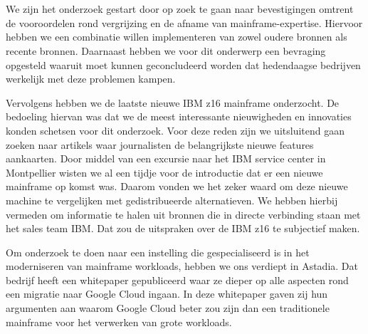 
\chapter{}
\label{ch:methodologie}



\section{}
\label{sec:De literatuur- en vergelijkende studie}

We zijn het onderzoek gestart door op zoek te gaan naar bevestigingen omtrent de vooroordelen rond vergrijzing en de afname van mainframe-expertise. Hiervoor hebben we een combinatie willen implementeren van zowel oudere bronnen als recente bronnen. Daarnaast hebben we voor dit onderwerp een bevraging opgesteld waaruit moet kunnen geconcludeerd worden dat hedendaagse bedrijven werkelijk met deze problemen kampen. 

Vervolgens hebben we de laatste nieuwe IBM z16 mainframe onderzocht. De bedoeling hiervan was dat we de meest interessante nieuwigheden en innovaties konden schetsen voor dit onderzoek. Voor deze reden zijn we uitsluitend gaan zoeken naar artikels waar journalisten de belangrijkste nieuwe features aankaarten. Door middel van een excursie naar het IBM service center in Montpellier wisten we al een tijdje voor de introductie dat er een nieuwe mainframe op komst was. Daarom vonden we het zeker waard om deze nieuwe machine te vergelijken met gedistribueerde alternatieven. We hebben hierbij vermeden om informatie te halen uit bronnen die in directe verbinding staan met het sales team IBM. Dat zou de uitspraken over de IBM z16 te subjectief maken. 

Om onderzoek te doen naar een instelling die gespecialiseerd is in het moderniseren van mainframe workloads, hebben we ons verdiept in Astadia. Dat bedrijf heeft een whitepaper gepubliceerd waar ze dieper op alle aspecten rond een migratie naar Google Cloud ingaan. In deze whitepaper gaven zij hun argumenten aan waarom Google Cloud beter zou zijn dan een traditionele mainframe voor het verwerken van grote workloads. 


